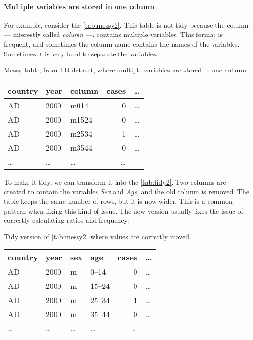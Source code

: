 \paragraph{Multiple variables are stored in one column}  For example, consider the
\cref{tab:messy2}.  This table is not tidy because the column --- interestly called
\emph{column} ---, contains multiple variables.  This format is frequent, and sometimes the
column name contains the names of the variables.  Sometimes it is very hard to separate
the variables.

\begin{tablebox}[label=tab:messy2]{Messy table, from TB dataset, where multiple variables are stored in one column.}
  \centering
  \begin{tabular}{l l l r c}
    \toprule
    country & year & column & cases & \dots \\
    \midrule
    AD & 2000 & m014 & 0 & \dots \\
    AD & 2000 & m1524 & 0 & \dots \\
    AD & 2000 & m2534 & 1 & \dots \\
    AD & 2000 & m3544 & 0 & \dots \\
    \dots & \dots & \dots & \dots \\
    \bottomrule
  \end{tabular}
\end{tablebox}

To make it tidy, we can transform it into the \cref{tab:tidy2}.  Two columns are created
to contain the variables \emph{Sex} and \emph{Age}, and the old column is removed.  The
table keeps the same number of rows, but it is now wider.  This is a common pattern when
fixing this kind of issue.  The new version usually fixes the issue of correctly
calculating ratios and frequency.

\begin{tablebox}[label=tab:tidy2]{Tidy version of \cref{tab:messy2} where values are correctly moved.}
  \centering
  \begin{tabular}{l l l l r c}
    \toprule
    country & year & sex & age & cases & \dots \\
    \midrule
    AD & 2000 & m & 0--14 & 0 & \dots \\
    AD & 2000 & m & 15--24 & 0 & \dots \\
    AD & 2000 & m & 25--34 & 1 & \dots \\
    AD & 2000 & m & 35--44 & 0 & \dots \\
    \dots & \dots & \dots & \dots & \dots \\
    \bottomrule
  \end{tabular}
\end{tablebox}


